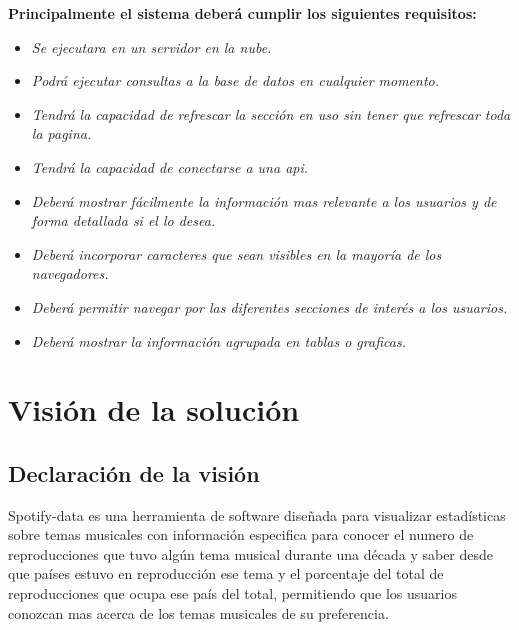 \documentclass[12pt,a4paper]{book}
\begin{document}
\textbf{Principalmente el sistema deberá cumplir los siguientes requisitos: }
\vspace{0.5 cm}
\begin{itemize}
\item \textit{Se ejecutara en un servidor en la nube.}
\item \textit{Podrá ejecutar consultas a la base de datos en cualquier momento.}
\item \textit{Tendrá la capacidad de refrescar la sección en uso sin tener que refrescar toda la pagina.}
\item \textit{Tendrá la capacidad de conectarse a una api.}
\item \textit{Deberá mostrar fácilmente la información mas relevante a los usuarios y de forma detallada si el lo desea.}
\item \textit{Deberá incorporar caracteres que sean visibles en la mayoría de los navegadores.}
\item \textit{Deberá permitir navegar por las diferentes secciones de interés a los usuarios.}
\item \textit{Deberá mostrar la información agrupada en tablas o graficas.}
\end{itemize}

\chapter{Visión de la solución}

\section{Declaración de la visión}
\vspace{0.5 cm}
Spotify-data es una herramienta de software diseñada para visualizar estadísticas sobre temas musicales con información especifica para conocer el numero de reproducciones que tuvo algún tema musical durante una década y saber desde que países estuvo en reproducción ese tema y el porcentaje del total de reproducciones que ocupa ese país del total, permitiendo que los usuarios conozcan mas acerca de los temas musicales de su preferencia.
\end{document}
